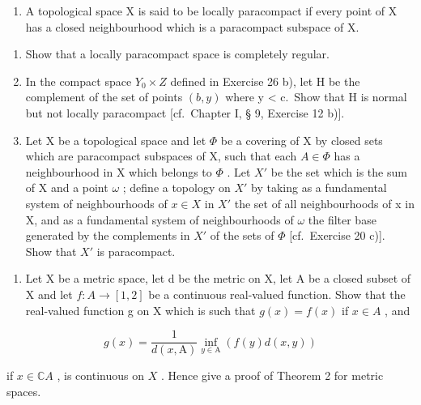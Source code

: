 \begin{enumerate}
\def\labelenumi{\arabic{enumi})}
\setcounter{enumi}{26}
\tightlist
\item
  A topological space X is said to be locally paracompact if every point of X has a closed neighbourhood which is a paracompact subspace of X.
\end{enumerate}

\begin{enumerate}
\def\labelenumi{\alph{enumi})}
\item
  Show that a locally paracompact space is completely regular.
\item
  In the compact space \(Y_{0} \times Z\) defined in Exercise 26 b), let H be the complement of the set of points \((b, y)\) where y \textless{} c.~Show that H is normal but not locally paracompact {[}cf.~Chapter I, § 9, Exercise 12 b){]}.
\item
  Let X be a topological space and let \(\Phi\) be a covering of X by closed sets which are paracompact subspaces of X, such that each \(A \in \Phi\) has a neighbourhood in X which belongs to \(\Phi\) . Let \(X'\) be the set which is the sum of X and a point \(\omega\) ; define a topology on \(X'\) by taking as a fundamental system of neighbourhoods of \(x \in X\) in \(X'\) the set of all neighbourhoods of x in X, and as a fundamental system of neighbourhoods of \(\omega\) the filter base generated by the complements in \(X'\) of the sets of \(\Phi\) {[}cf.~Exercise 20 c){]}. Show that \(X'\) is paracompact.
\end{enumerate}

\begin{enumerate}
\def\labelenumi{\arabic{enumi})}
\setcounter{enumi}{27}
\tightlist
\item
  Let X be a metric space, let d be the metric on X, let A be a closed subset of X and let \(f: A \to [1, 2]\) be a continuous real-valued function. Show that the real-valued function g on X which is such that \(g(x) = f(x)\) if \(x \in A\) , and
\end{enumerate}

\[
g (x) = \frac {\mathrm{1}}{d (x , \mathrm{A})} \inf _ {y \in \mathrm{A}} (f (y) d (x, y))
\]

if \(x \in \mathbb{C}A\) , is continuous on \(X\) . Hence give a proof of Theorem 2 for metric spaces.

